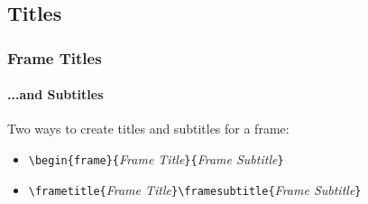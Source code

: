 \subsection{Titles}
\begin{frame}[fragile]
\frametitle{Frame Titles}
\framesubtitle{...and Subtitles}

  Two ways to create titles and subtitles for a frame:

  \begin{itemize}
    \item \verb|\begin{frame}{|\emph{Frame Title}\verb|}{|\emph{Frame Subtitle}\verb|}|
    \item \verb|\frametitle{|\emph{Frame Title}\verb|}\framesubtitle{|\emph{Frame Subtitle}\verb|}|
  \end{itemize}

\end{frame}
